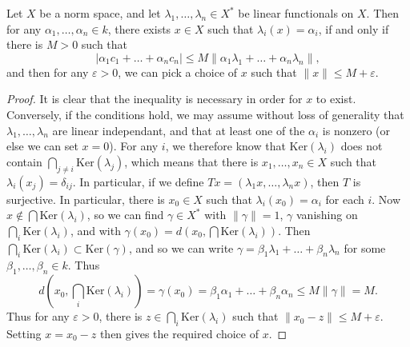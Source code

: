 \begin{theorem}[Helly]
    Let $X$ be a norm space, and let $\lambda_1,\dots,\lambda_n \in X^*$ be linear functionals on $X$. Then for any $\alpha_1,\dots,\alpha_n \in k$, there exists $x \in X$ such that $\lambda_i(x) = \alpha_i$, if and only if there is $M > 0$ such that
    \[ |\alpha_1 c_1 + \dots + \alpha_n c_n | \leq M \| \alpha_1 \lambda_1 + \dots + \alpha_n \lambda_n \|, \]
    and then for any $\varepsilon > 0$, we can pick a choice of $x$ such that $\| x \| \leq M + \varepsilon$.
\end{theorem}
\begin{proof}
    It is clear that the inequality is necessary in order for $x$ to exist. Conversely, if the conditions hold, we may assume without loss of generality that $\lambda_1, \dots, \lambda_n$ are linear independant, and that at least one of the $\alpha_i$ is nonzero (or else we can set $x = 0$). For any $i$, we therefore know that $\text{Ker}(\lambda_i)$ does not contain $\bigcap_{j \neq i} \text{Ker}(\lambda_j)$, which means that there is $x_1, \dots, x_n \in X$ such that $\lambda_i(x_j) = \delta_{ij}$. In particular, if we define $Tx = (\lambda_1 x, \dots, \lambda_n x)$, then $T$ is surjective. In particular, there is $x_0 \in X$ such that $\lambda_i(x_0) = \alpha_i$ for each $i$. Now $x \not \in \bigcap \text{Ker}(\lambda_i)$, so we can find $\gamma \in X^*$ with $\| \gamma \| = 1$, $\gamma$ vanishing on $\bigcap_i \text{Ker}(\lambda_i)$, and with $\gamma(x_0) = d(x_0,\bigcap \text{Ker}(\lambda_i))$. Then $\bigcap_i \text{Ker}(\lambda_i) \subset \text{Ker}(\gamma)$, and so we can write $\gamma = \beta_1 \lambda_1 + \dots + \beta_n \lambda_n$ for some $\beta_1,\dots,\beta_n \in k$. Thus
    \[ d(x_0, \bigcap_i \text{Ker}(\lambda_i)) = \gamma(x_0) = \beta_1 \alpha_1 + \dots + \beta_n \alpha_n \leq M \| \gamma \| = M. \]
    Thus for any $\varepsilon > 0$, there is $z \in \bigcap_i \text{Ker}(\lambda_i)$ such that $\| x_0 - z \| \leq M + \varepsilon$. Setting $x = x_0 - z$ then gives the required choice of $x$.
\end{proof}

